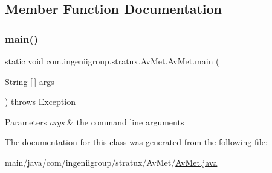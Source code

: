 \subsection{Member Function Documentation}
\mbox{\label{classcom_1_1ingeniigroup_1_1stratux_1_1_av_met_1_1_av_met_ae763fd652baed7ceb7e46db6c7062837}} 
\subsubsection{\texorpdfstring{main()}{main()}}
{\footnotesize\ttfamily static void com.\+ingeniigroup.\+stratux.\+Av\+Met.\+Av\+Met.\+main (\begin{DoxyParamCaption}\item[{String \mbox{[}$\,$\mbox{]}}]{args }\end{DoxyParamCaption}) throws Exception\hspace{0.3cm}{\ttfamily [static]}}


\begin{DoxyParams}{Parameters}
{\em args} & the command line arguments \\
\hline
\end{DoxyParams}


The documentation for this class was generated from the following file\+:\begin{DoxyCompactItemize}
\item 
main/java/com/ingeniigroup/stratux/\+Av\+Met/\hyperlink{_av_met_8java}{Av\+Met.\+java}\end{DoxyCompactItemize}
